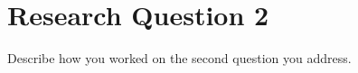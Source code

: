 \section{Research Question 2} \label{question2} %

Describe how you worked on the second question you address.

\blindtext
